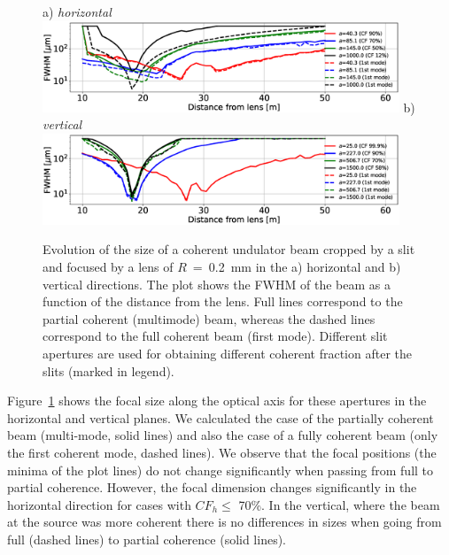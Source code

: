 \documentclass{iucr}              %
\begin{document}
\begin{figure}\label{fig:oneTFundPartialCoherence}
    \flushleft a) {\it horizontal}\\ \centering
    \includegraphics[width=0.95\textwidth]{figures/oneTF_UndSource_RectSlit_R200um_PartialCoherence_h.eps}
    \flushleft b) {\it vertical}\\ \centering
    \includegraphics[width=0.95\textwidth]{figures/oneTF_UndSource_RectSlit_R200um_PartialCoherence_v.eps}

    \caption{Evolution of the size of a coherent undulator beam cropped by a slit and focused by a lens of $R$~=~\SI{0.2}{\milli\meter} in the a) horizontal and b) vertical directions.
    The plot shows the FWHM of the beam  as a function of the distance from the lens.
    Full lines correspond to the partial coherent (multimode) beam, whereas the dashed lines correspond to the full coherent beam (first mode). Different slit apertures are used for obtaining different coherent fraction after the slits (marked in legend).
    }
\end{figure}

Figure~\ref{fig:oneTFundPartialCoherence} shows the focal size along the optical axis for these apertures in the horizontal and vertical planes. We calculated the case of the partially coherent beam (multi-mode, solid lines) and also the case of a fully coherent beam (only the first coherent mode, dashed lines). We observe that the focal positions (the minima of the plot lines) do not change significantly when passing from full to partial coherence. However, the focal dimension changes significantly in the horizontal direction for cases with $CF_h\le$ 70\%. In the vertical, where the beam at the source was more coherent there is no differences in sizes when going from full (dashed lines) to partial coherence (solid lines).
\end{document}
